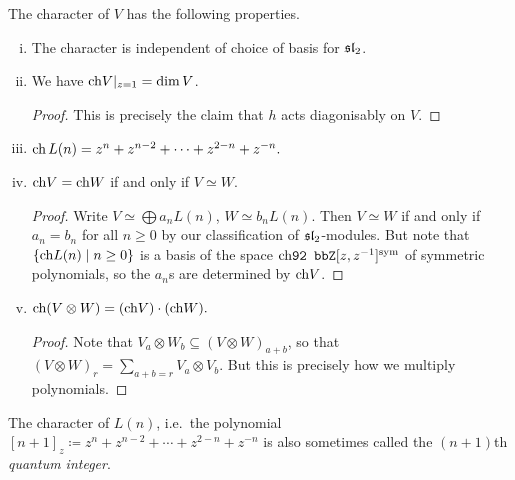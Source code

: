 \begin{proposition}
    The character of $V$ has the following properties. 
    \begin{enumerate}[(i)]
        \item The character is independent of choice of basis for $\sl_2$.
        \item We have $\char V|_{z=1}=\dim V$.
            \begin{proof} This is precisely the claim that $h$ acts diagonisably
            on $V$.\end{proof}
        \item $\char\, L(n) = z^n + z^{n-2} + \cdots + z^{2-n} + z^{-n}.$
        \item $\char V = \char W$ if and only if $V\simeq W.$
            \begin{proof}
                Write $V\simeq \bigoplus a_n L(n)$, $W\simeq b_n L(n)$. Then
                $V\simeq W$ if and only if $a_n = b_n$ for all $n\geq 0$ by our
                classification of $\sl_2$-modules. But note that $\{\char
                L(n)\;|\; n\geq 0\}$ is a basis of the space
                $\bbZ[z,z^{-1}]^{\text{sym}}$ of symmetric polynomials, so the
                $a_n$s are determined by $\char V$.
            \end{proof}

        \item $\char (V\otimes W) = (\char V )\cdot (\char W).$
            \begin{proof}
                Note that $V_a\otimes W_b \subseteq (V\otimes W)_{a+b}$, so
                that $(V\otimes W)_r = \sum_{a+b = r}V_a\otimes V_b$. But this
                is precisely how we multiply polynomials.
            \end{proof}
    \end{enumerate}
\end{proposition}

The character of $L(n)$, i.e.\ the polynomial $[n+1]_z\coloneqq z^n + z^{n-2} +
\cdots + z^{2-n} + z^{-n}$ is also sometimes called the $(n+1)$th \emph{quantum
integer}.

